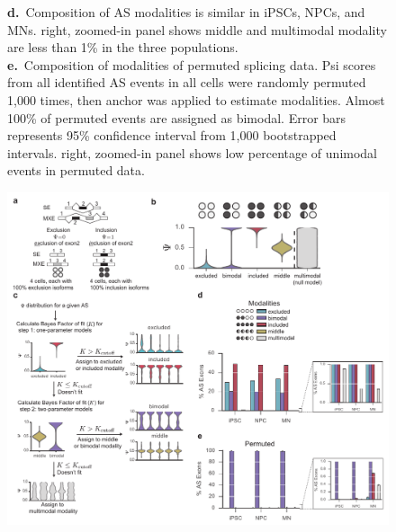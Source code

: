 \begin{figure}[h]
{\textbf{d.}~Composition of AS modalities is similar in iPSCs, NPCs, and MNs. right, zoomed-in panel shows middle and multimodal modality are less than 1\% in the three populations.\\
\textbf{e.}~Composition of modalities of permuted splicing data. Psi scores from all identified AS events in all cells were randomly permuted 1,000 times, then anchor was applied to estimate modalities. Almost 100\% of permuted events are assigned as bimodal. Error bars represents 95\% confidence interval from 1,000 bootstrapped intervals. right, zoomed-in panel shows low percentage of unimodal events in permuted data.
}
\label{fig:anchor_overview}
\end{figure}
\clearpage
\begin{figure}[h]
\ContinuedFloat
\captionsetup{labelformat=empty}
\centering
\includegraphics[width=5.8in]{figures/anchor_overview.pdf}
\end{figure}
\clearpage



